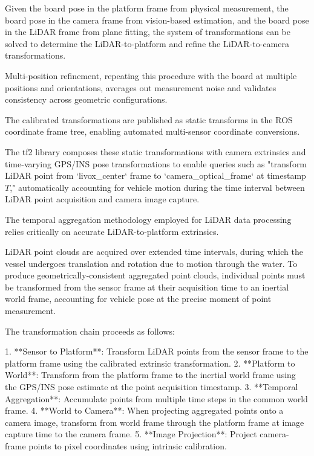 Given the board pose in the platform frame from physical measurement, the board pose in the camera frame from vision-based estimation, and the board pose in the LiDAR frame from plane fitting, the system of transformations can be solved to determine the LiDAR-to-platform and refine the LiDAR-to-camera transformations.

Multi-position refinement, repeating this procedure with the board at multiple positions and orientations, averages out measurement noise and validates consistency across geometric configurations.


The calibrated transformations are published as static transforms in the ROS coordinate frame tree, enabling automated multi-sensor coordinate conversions.


The tf2 library composes these static transformations with camera extrinsics and time-varying GPS/INS pose transformations to enable queries such as "transform LiDAR point from `livox\_center` frame to `camera\_optical\_frame` at timestamp $T$," automatically accounting for vehicle motion during the time interval between LiDAR point acquisition and camera image capture.


The temporal aggregation methodology employed for LiDAR data processing relies critically on accurate LiDAR-to-platform extrinsics.

LiDAR point clouds are acquired over extended time intervals, during which the vessel undergoes translation and rotation due to motion through the water.
To produce geometrically-consistent aggregated point clouds, individual points must be transformed from the sensor frame at their acquisition time to an inertial world frame, accounting for vehicle pose at the precise moment of point measurement.

The transformation chain proceeds as follows:

1. **Sensor to Platform**: Transform LiDAR points from the sensor frame to the platform frame using the calibrated extrinsic transformation.
2. **Platform to World**: Transform from the platform frame to the inertial world frame using the GPS/INS pose estimate at the point acquisition timestamp.
3. **Temporal Aggregation**: Accumulate points from multiple time steps in the common world frame.
4. **World to Camera**: When projecting aggregated points onto a camera image, transform from world frame through the platform frame at image capture time to the camera frame.
5. **Image Projection**: Project camera-frame points to pixel coordinates using intrinsic calibration.

